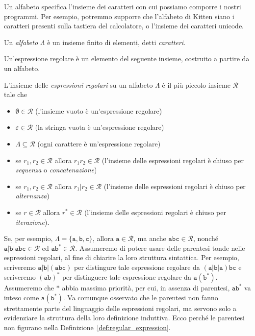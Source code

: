 Un alfabeto specifica l'insieme dei caratteri con cui possiamo comporre
i nostri programmi. Per esempio, potremmo supporre che l'alfabeto di Kitten
siano i caratteri presenti sulla tastiera del calcolatore, o l'insieme dei
caratteri unicode.
%
\begin{definition}[Alfabeto]\label{def:alphabet}
Un \emph{alfabeto} $\Lambda$ \`e un insieme finito di elementi, detti
\emph{caratteri}.
\end{definition}
%
\noindent
Un'espressione regolare \`e un elemento del seguente insieme, costruito
a partire da un alfabeto.
%
\begin{definition}\label{def:regular_expression}
L'insieme delle \emph{espressioni regolari} su un alfabeto
$\Lambda$ \`e il pi\`u piccolo insieme $\mathcal{R}$ tale che
%
\begin{itemize}
\item $\emptyset\in\mathcal{R}$ (l'insieme vuoto \`e un'espressione regolare)
\item $\varepsilon\in\mathcal{R}$ (la stringa vuota \`e un'espressione
      regolare)
\item $\Lambda\subseteq\mathcal{R}$ (ogni carattere \`e un'espressione
      regolare)
\item se $r_1,r_2\in\mathcal{R}$ allora $r_1r_2\in\mathcal{R}$
      (l'insieme delle espressioni regolari \`e chiuso per \emph{sequenza} o
      \emph{concatenazione})
\item se $r_1,r_2\in\mathcal{R}$ allora $r_1|r_2\in\mathcal{R}$
      (l'insieme delle espressioni regolari \`e chiuso per \emph{alternanza})
\item se $r\in\mathcal{R}$ allora $r^*\in\mathcal{R}$
      (l'insieme delle espressioni regolari \`e chiuso per \emph{iterazione}).
\end{itemize}
\end{definition}
%
Se, per esempio, $\Lambda=\{\mathtt{a},\mathtt{b},\mathtt{c}\}$, allora
$\mathtt{a}\in\mathcal{R}$, ma anche $\mathtt{abc}\in\mathcal{R}$, nonch\'e
$\mathtt{a|b|abc}\in\mathcal{R}$ ed $\mathtt{ab}^*\in\mathcal{R}$.
Assumeremo di potere usare delle parentesi tonde nelle espressioni
regolari, al fine di chiarire la loro struttura sintattica.
Per esempio, scriveremo $\mathtt{a|b|(abc)}$ per distingure tale espressione
regolare da $\mathtt{(a|b|a)bc}$ e scriveremo $\mathtt{(ab)}^*$ per distinguere
tale espressione regolare da $\mathtt{a(b^*)}$. Assumeremo che $*$ abbia
massima priorit\`a, per cui, in assenza di parentesi,
$\mathtt{ab^*}$ va inteso come $\mathtt{a(b^*)}$.
Va comunque osservato che le parentesi non fanno strettamente parte del
linguaggio delle espressioni regolari, ma servono solo a evidenziare la
struttura della loro definizione induttiva. Ecco perch\'e le parentesi
non figurano nella Definizione~\ref{def:regular_expression}.

